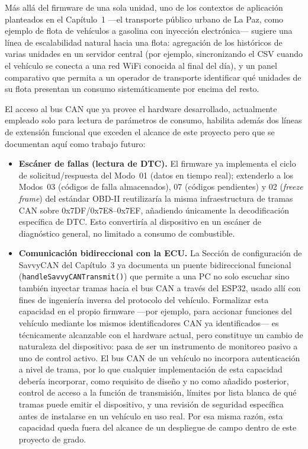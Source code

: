 Más allá del firmware de una sola unidad, uno de los contextos de aplicación planteados en el Capítulo~1 —el transporte público urbano de La Paz, como ejemplo de flota de vehículos a gasolina con inyección electrónica— sugiere una línea de escalabilidad natural hacia una flota: agregación de los históricos de varias unidades en un servidor central (por ejemplo, sincronizando el CSV cuando el vehículo se conecta a una red WiFi conocida al final del día), y un panel comparativo que permita a un operador de transporte identificar qué unidades de su flota presentan un consumo sistemáticamente por encima del resto.

El acceso al bus CAN que ya provee el hardware desarrollado, actualmente empleado solo para lectura de parámetros de consumo, habilita además dos líneas de extensión funcional que exceden el alcance de este proyecto pero que se documentan aquí como trabajo futuro:

\begin{itemize}
	\item \textbf{Escáner de fallas (lectura de DTC).} El firmware ya implementa el ciclo de solicitud/respuesta del Modo~01 (datos en tiempo real); extenderlo a los Modos~03 (códigos de falla almacenados), 07 (códigos pendientes) y 02 (\textit{freeze frame}) del estándar OBD-II reutilizaría la misma infraestructura de tramas CAN sobre 0x7DF/0x7E8--0x7EF, añadiendo únicamente la decodificación específica de DTC. Esto convertiría al dispositivo en un escáner de diagnóstico general, no limitado a consumo de combustible.
	\item \textbf{Comunicación bidireccional con la ECU.} La Sección de configuración de SavvyCAN del Capítulo~3 ya documenta un puente bidireccional funcional (\texttt{handleSavvyCANTransmit()}) que permite a una PC no solo escuchar sino también inyectar tramas hacia el bus CAN a través del ESP32, usado allí con fines de ingeniería inversa del protocolo del vehículo. Formalizar esta capacidad en el propio firmware —por ejemplo, para accionar funciones del vehículo mediante los mismos identificadores CAN ya identificados— es técnicamente alcanzable con el hardware actual, pero constituye un cambio de naturaleza del dispositivo: pasa de ser un instrumento de monitoreo pasivo a uno de control activo. El bus CAN de un vehículo no incorpora autenticación a nivel de trama, por lo que cualquier implementación de esta capacidad debería incorporar, como requisito de diseño y no como añadido posterior, control de acceso a la función de transmisión, límites por lista blanca de qué tramas puede emitir el dispositivo, y una revisión de seguridad específica antes de instalarse en un vehículo en uso real. Por esa misma razón, esta capacidad queda fuera del alcance de un despliegue de campo dentro de este proyecto de grado.
\end{itemize}

